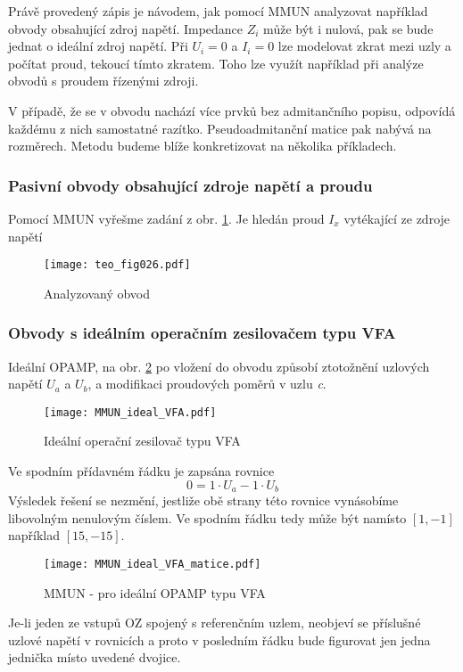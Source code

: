         Právě provedený zápis je návodem, jak pomocí MMUN analyzovat například obvody obsahující 
        zdroj napětí. Impedance $Z_i$ může být i nulová, pak se bude jednat o ideální zdroj napětí. 
        Při $U_i = 0$ a $I_i = 0$ lze modelovat zkrat mezi uzly a počítat proud, tekoucí tímto 
        zkratem. Toho lze využít například při analýze obvodů s proudem řízenými zdroji. 
        
        V případě, že se v obvodu nachází více prvků bez admitančního popisu, odpovídá každému z 
        nich samostatné razítko. Pseudoadmitanční matice pak nabývá na rozměrech. Metodu budeme 
        blíže konkretizovat na několika příkladech. 
  
        \subsubsection{Pasivní obvody obsahující zdroje napětí a proudu}
          Pomocí MMUN vyřešme zadání z obr. \ref{teo:fig026}. Je hledán proud \(I_x\) 
          vytékající ze zdroje napětí 
          \begin{figure}[ht!]  %
            \centering
            \texttt{[image: teo\_fig026.pdf]}
            \caption{Analyzovaný obvod}
            \label{teo:fig026}
          \end{figure}
          
        \subsubsection{Obvody s ideálním operačním zesilovačem ty\-pu VFA}
          Ideální OPAMP, na obr. \ref{TEO:fig_MMUN_ideal_VFA} po vložení do obvodu způsobí 
          ztotožnění uzlových napětí $U_a$ a $U_b$, a modifikaci proudových poměrů v uzlu \emph{c}.
      
          \begin{figure}[ht!]
            \centering
            \texttt{[image: MMUN\_ideal\_VFA.pdf]}
            \caption[Ideální operační zesilovač typu VFA]{Ideální operační zesilovač typu VFA}
            \label{TEO:fig_MMUN_ideal_VFA}
          \end{figure}
          Ve spodním přídavném řádku je zapsána rovnice
          \begin{equation}\label{TEO:eq_MMUN_VFA}
              0 = 1\cdot U_a - 1\cdot U_b
          \end{equation}
          Výsledek řešení se nezmění, jestliže obě strany této rovnice vynásobíme libovolným 
          nenulovým číslem. Ve spodním řádku tedy může být namísto $[1,-1]$ například $[15,-15]$.
          \begin{figure}[ht!]
            \centering
            \texttt{[image: MMUN\_ideal\_VFA\_matice.pdf]}
            \caption[MMUN - pro ideální OPAMP]{MMUN - pro ideální OPAMP typu VFA}
            \label{TEO:fig_MMUN_VFA_matice}
          \end{figure}
          Je-li jeden ze vstupů OZ spojený s referenčním uzlem, neobjeví se příslušné uzlové napětí 
          v rovnicích a proto v posledním řádku bude figurovat jen jedna jednička místo uvedené 
          dvojice. 
          
